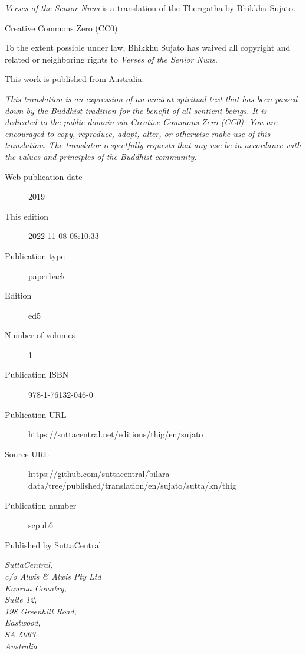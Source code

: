 \documentclass[12pt,openany]{book}%
\begin{document}
\begin{footnotesize}

\textit{Verses of the Senior Nuns} is a translation of the Therīgāthā by Bhikkhu Sujato.

\medskip

Creative Commons Zero (CC0)

To the extent possible under law, Bhikkhu Sujato has waived all copyright and related or neighboring rights to \textit{Verses of the Senior Nuns}.

\medskip

This work is published from Australia.

\begin{center}
\textit{This translation is an expression of an ancient spiritual text that has been passed down by the Buddhist tradition for the benefit of all sentient beings. It is dedicated to the public domain via Creative Commons Zero (CC0). You are encouraged to copy, reproduce, adapt, alter, or otherwise make use of this translation. The translator respectfully requests that any use be in accordance with the values and principles of the Buddhist community.}
\end{center}

\medskip

\begin{description}
    \item[Web publication date] 2019
    \item[This edition] 2022-11-08 08:10:33
    \item[Publication type] paperback
    \item[Edition] ed5
    \item[Number of volumes] 1
    \item[Publication ISBN] 978-1-76132-046-0
    \item[Publication URL] https://suttacentral.net/editions/thig/en/sujato
    \item[Source URL] https://github.com/suttacentral/bilara-data/tree/published/translation/en/sujato/sutta/kn/thig
    \item[Publication number] scpub6
\end{description}

\medskip

Published by SuttaCentral

\medskip

\textit{SuttaCentral,\\
c/o Alwis \& Alwis Pty Ltd\\
Kaurna Country,\\
Suite 12,\\
198 Greenhill Road,\\
Eastwood,\\
SA 5063,\\
Australia}

\end{footnotesize}
\end{document}
